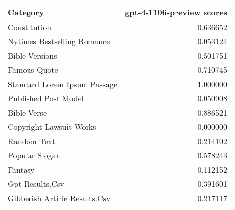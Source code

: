 \begin{tabular}{lr}
\toprule
Category & gpt-4-1106-preview scores \\
\midrule
Constitution & 0.636652 \\
Nytimes Bestselling Romance & 0.053124 \\
Bible Versions & 0.501751 \\
Famous Quote & 0.710745 \\
Standard Lorem Ipsum Passage & 1.000000 \\
Published Post Model & 0.050908 \\
Bible Verse & 0.886521 \\
Copyright Lawsuit Works & 0.000000 \\
Random Text & 0.214102 \\
Popular Slogan & 0.578243 \\
Fantasy & 0.112152 \\
Gpt Results.Csv & 0.391601 \\
Gibberish Article Results.Csv & 0.217117 \\
\bottomrule
\end{tabular}
